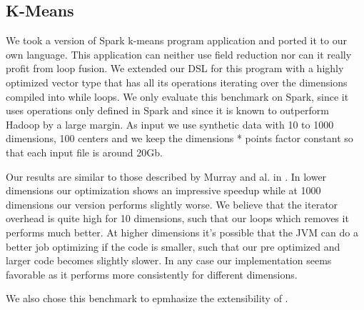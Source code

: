 \subsection{K-Means}
\label{subsec:kmeans}

We took a version of Spark k-means program  application and ported it to our own language. This application can neither use field reduction nor can it really profit from loop fusion. We extended our DSL for this program with a highly optimized vector type that has all its operations iterating over the dimensions compiled into while loops. We only evaluate this benchmark on Spark, since it uses operations only defined in Spark and since it is known to outperform Hadoop by a large margin. As input we use synthetic data with 10 to 1000 dimensions, 100 centers and we keep the dimensions * points factor constant so that each input file is around 20Gb.

Our results are similar to those described by Murray and al. in \cite{Steno}. In lower dimensions our optimization shows an impressive speedup while at 1000 dimensions our version performs slightly worse. We believe that the iterator overhead is quite high for 10 dimensions, such that our loops which removes it performs much better. At higher dimensions it's possible that the JVM can do a better job optimizing if the code is smaller, such that our pre optimized and larger code becomes slightly slower. In any case our implementation seems favorable as it performs more consistently for different dimensions.

We also chose this benchmark to epmhasize the extensibility of \tool.